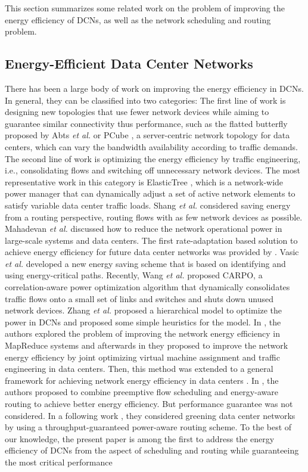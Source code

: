 \documentclass[10pt, conference, compsocconf]{IEEEtran}
\begin{document}
This section summarizes some related work on the problem of improving the energy efficiency of DCNs, as well as the network scheduling and routing problem.

\subsection{Energy-Efficient Data Center Networks}

There has been a large body of work on improving the energy efficiency in DCNs. In general, they can be classified into two categories: The first line of work is designing new topologies that use fewer network devices while aiming to guarantee similar connectivity thus performance, such as the flatted butterfly proposed by Abts \emph{et al.} \cite{Abts_Marty-2010} or PCube \cite{Huang_Jia-2011}, a server-centric network topology for data centers, which can vary the bandwidth availability according to traffic demands. The second line of work is optimizing the energy efficiency by traffic engineering, i.e., consolidating flows and switching off unnecessary network devices. The most representative work in this category is ElasticTree \cite{Heller_Seetharaman}, which is a network-wide power manager that can dynamically adjust a set of active network elements to satisfy variable data center traffic loads. Shang \emph{et al.} \cite{Shang_Li} considered saving energy from a routing perspective, routing flows with as few network devices as possible. Mahadevan \emph{et al.} \cite{Mahadevan_banerjee-2011} discussed how to reduce the network operational power in large-scale systems and data centers. The first rate-adaptation based solution to achieve energy efficiency for future data center networks was provided by \cite{Wang_Zhang-2013}. Vasic \emph{et al.} \cite{Vasic_Bhurat-2011} developed a new energy saving scheme that is based on identifying and using energy-critical paths. Recently, Wang \emph{et al.} \cite{Wang_Yao} proposed CARPO, a correlation-aware power optimization algorithm that dynamically consolidates traffic flows onto a small set of links and switches and shuts down unused network devices. Zhang \emph{et al.} \cite{Zhang_Ansari-2012} proposed a hierarchical model to optimize the power in DCNs and proposed some simple heuristics for the model. In \cite{Wang_Zhang-2013-ICCCN}, the authors explored the problem of improving the network energy efficiency in MapReduce systems and afterwards in \cite{Wang_Zhang-PER-2013} they proposed to improve the network energy efficiency by joint optimizing virtual machine assignment and traffic engineering in data centers. Then, this method was extended to a general framework for achieving network energy efficiency in data centers  \cite{Wang_Zhang-JSAC-2013}. In \cite{Shang_li-2013}, the authors proposed to combine preemptive flow scheduling and energy-aware routing to achieve better energy efficiency. But performance guarantee was not considered. In a following work \cite{Xu_Shang-2013}, they considered greening data center networks by using a throughput-guaranteed power-aware routing scheme. To the best of our knowledge, the present paper is among the first to address the energy efficiency of DCNs from the aspect of scheduling and routing while guaranteeing the most critical performance 
\end{document}
